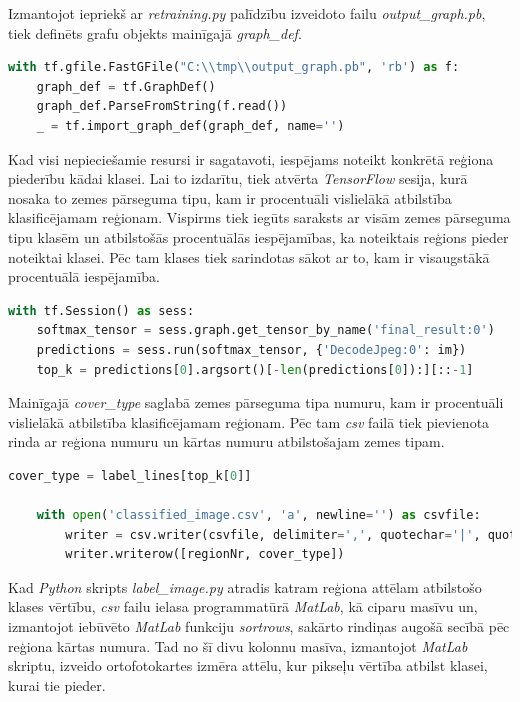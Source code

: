 \documentclass[12pt,paper=a4]{report}
\begin{document}
Izmantojot iepriekš ar \textit{retraining.py} palīdzību izveidoto failu \textit{output_graph.pb}, tiek definēts grafu objekts mainīgajā \textit{graph_def}.
\begin{lstlisting}[language=python]
with tf.gfile.FastGFile("C:\\tmp\\output_graph.pb", 'rb') as f:
    graph_def = tf.GraphDef()
    graph_def.ParseFromString(f.read())
    _ = tf.import_graph_def(graph_def, name='')
\end{lstlisting}\par
Kad visi nepieciešamie resursi ir sagatavoti, iespējams noteikt konkrētā reģiona piederību kādai klasei. Lai to izdarītu, tiek atvērta \textit{TensorFlow} sesija, kurā nosaka to zemes pārseguma tipu, kam ir procentuāli vislielākā atbilstība klasificējamam reģionam. Vispirms tiek iegūts saraksts ar visām zemes pārseguma tipu klasēm un atbilstošās procentuālās iespējamības, ka noteiktais reģions pieder noteiktai klasei. Pēc tam klases tiek sarindotas sākot ar to, kam ir visaugstākā procentuālā iespējamība. 
\begin{lstlisting}[language=python]
with tf.Session() as sess:
    softmax_tensor = sess.graph.get_tensor_by_name('final_result:0')
    predictions = sess.run(softmax_tensor, {'DecodeJpeg:0': im})
    top_k = predictions[0].argsort()[-len(predictions[0]):][::-1]
\end{lstlisting}\par
Mainīgajā \textit{cover_type} saglabā zemes pārseguma tipa numuru, kam ir procentuāli vislielākā atbilstība klasificējamam reģionam. Pēc tam \textit{csv} failā tiek pievienota rinda ar reģiona numuru un kārtas numuru atbilstošajam zemes tipam.
\begin{lstlisting}[language=python]
	cover_type = label_lines[top_k[0]]

    with open('classified_image.csv', 'a', newline='') as csvfile:
        writer = csv.writer(csvfile, delimiter=',', quotechar='|', quoting=csv.QUOTE_MINIMAL)
        writer.writerow([regionNr, cover_type])
\end{lstlisting}\par
Kad \textit{Python} skripts \textit{label_image.py} atradis katram reģiona attēlam atbilstošo klases vērtību, \textit{csv} failu ielasa programmatūrā \textit{MatLab}, kā ciparu masīvu un, izmantojot iebūvēto \textit{MatLab} funkciju \textit{sortrows}, sakārto rindiņas augošā secībā pēc reģiona kārtas numura. Tad no šī divu kolonnu masīva, izmantojot \textit{MatLab} skriptu, izveido ortofotokartes izmēra attēlu, kur pikseļu vērtība atbilst klasei, kurai tie pieder.\par 
\end{document}
